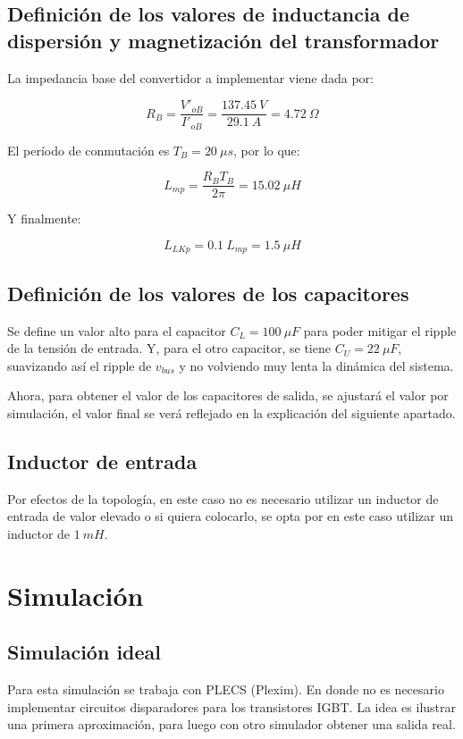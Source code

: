 \subsection{Definición de los valores de inductancia de dispersión y magnetización del transformador}

La impedancia base del convertidor a implementar viene dada por:

$$
R_B = \frac{V'_{oB}}{I'_{oB}}=\frac{137.45 \ V}{29.1 \ A}=4.72 \ \Omega
$$

El período de conmutación es $T_B=20 \ \mu s$, por lo que:

$$
L_{mp}=\frac{R_B T_B}{2 \pi}=15.02 \ \mu H
$$

Y finalmente:

$$
L_{LKp} = 0.1 \ L_{mp} = 1.5 \ \mu H
$$

\subsection{Definición de los valores de los capacitores}

Se define un valor alto para el capacitor $C_L=100 \ \mu F$ para poder mitigar el ripple de la tensión de entrada. Y, para el otro capacitor, se tiene $C_U=22 \ \mu F$, suavizando así el ripple de $v_{bus}$ y no volviendo muy lenta la dinámica del sistema. 

Ahora, para obtener el valor de los capacitores de salida, se ajustará el valor por simulación, el valor final se verá reflejado en la explicación del siguiente apartado.


\subsection{Inductor de entrada}

Por efectos de la topología, en este caso no es necesario utilizar un inductor de entrada de valor elevado o si quiera colocarlo, se opta por en este caso utilizar un inductor de $1 \ mH$.


\clearpage


\section{Simulación}

\subsection{Simulación ideal}

Para esta simulación se trabaja con PLECS (Plexim). En donde no es necesario implementar circuitos disparadores para los transistores IGBT. La idea es ilustrar una primera aproximación, para luego con otro simulador obtener una salida real.


